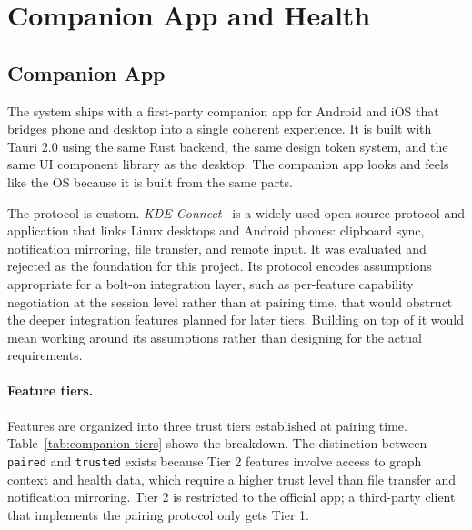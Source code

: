 \section{Companion App and Health}
\label{sec:companion-health}

\subsection{Companion App}
\label{sec:companion}

The system ships with a first-party companion app for Android and iOS that
bridges phone and desktop into a single coherent experience. It is built with
Tauri 2.0 using the same Rust backend, the same design token system, and the
same UI component library as the desktop. The companion app looks and feels
like the OS because it is built from the same parts.

The protocol is custom. \emph{KDE Connect}~\cite{kdeconnect} is a widely
used open-source protocol and application that links Linux desktops and Android
phones: clipboard sync, notification mirroring, file transfer, and remote
input. It was evaluated and rejected as the foundation for this project. Its
protocol encodes assumptions appropriate for a bolt-on integration layer,
such as per-feature capability negotiation at the session level rather than at
pairing time, that would obstruct the deeper integration features planned for
later tiers. Building on top of it would mean working around its assumptions
rather than designing for the actual requirements.

\paragraph{Feature tiers.}
Features are organized into three trust tiers established at pairing time.
Table~\ref{tab:companion-tiers} shows the breakdown. The distinction between
\texttt{paired} and \texttt{trusted} exists because Tier 2 features involve
access to graph context and health data, which require a higher trust
level than file transfer and notification mirroring. Tier 2 is restricted
to the official app; a third-party client that implements the pairing protocol
only gets Tier 1.

